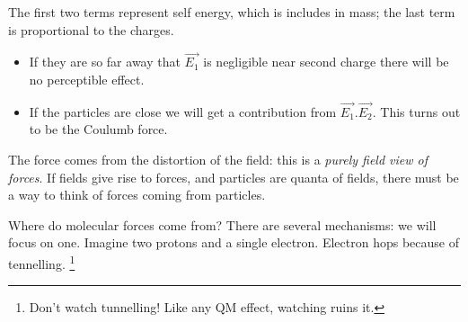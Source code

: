 \documentclass[]{article}
\begin{document}
The first two terms represent self energy, which is includes in mass; the last term is proportional to the charges.
\begin{itemize}
	\item  If they are so far away that $\vec{E_1}$ is negligible near second charge there will be no perceptible effect.
	\item If the particles are close we will get a contribution from $\vec{E_1}.\vec{E_2}$. This turns out to be the Coulumb force. 
\end{itemize}

The force comes from the distortion of the field: this is a \emph{purely field view of forces}. If fields give rise to forces, and particles are quanta of fields, there must be a way to think of forces coming from particles.

Where do molecular forces come from? There are several mechanisms: we will focus on one. Imagine two protons and a single electron. Electron hops because of tennelling. \footnote{Don't watch tunnelling! Like any QM effect, watching ruins it.}
\end{document}
